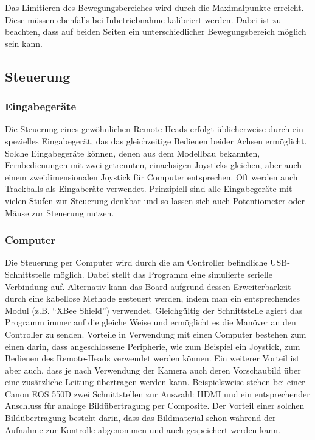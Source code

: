 \documentclass[a4paper, 12pt, bibtotocnumbered, liststotocnumbered]{scrartcl}
\begin{document}
	Das Limitieren des Bewegungsbereiches wird durch die Maximalpunkte erreicht. Diese müssen ebenfalls bei Inbetriebnahme kalibriert werden. Dabei ist zu beachten, dass auf beiden Seiten ein unterschiedlicher Bewegungsbereich möglich sein kann.

	\subsection{Steuerung}
	\subsubsection{Eingabegeräte}
	Die Steuerung eines gewöhnlichen Remote-Heads erfolgt üblicherweise durch ein spezielles Eingabegerät, das das gleichzeitige Bedienen beider Achsen ermöglicht. Solche Eingabegeräte können, denen aus dem Modellbau bekannten, Fernbedienungen mit zwei getrennten, einachsigen Joysticks gleichen, aber auch einem zweidimensionalen Joystick für Computer entsprechen. Oft werden auch Trackballs als Eingaberäte verwendet. Prinzipiell sind alle Eingabegeräte mit vielen Stufen zur Steuerung denkbar und so lassen sich auch Potentiometer oder Mäuse zur Steuerung nutzen.

	\subsubsection{Computer}
	Die Steuerung per Computer wird durch die am Controller befindliche USB-Schnittstelle möglich. Dabei stellt das Programm eine simulierte serielle Verbindung auf. Alternativ kann das Board aufgrund dessen Erweiterbarkeit durch eine kabellose Methode gesteuert werden, indem man ein entsprechendes Modul (z.B. “XBee Shield”) verwendet. Gleichgültig der Schnittstelle agiert das Programm immer auf die gleiche Weise und ermöglicht es die Manöver an den Controller zu senden. Vorteile in Verwendung mit einen Computer bestehen zum einen darin, dass angeschlossene Peripherie, wie zum Beispiel ein Joystick, zum Bedienen des Remote-Heads verwendet werden können. Ein weiterer Vorteil ist aber auch, dass je nach Verwendung der Kamera auch deren Vorschaubild über eine zusätzliche Leitung übertragen werden kann. Beispielsweise stehen bei einer Canon EOS 550D zwei Schnittstellen zur Auswahl: HDMI und ein entsprechender Anschluss für analoge Bildübertragung per Composite. Der Vorteil einer solchen Bildübertragung besteht darin, dass das Bildmaterial schon während der Aufnahme zur Kontrolle abgenommen und auch gespeichert werden kann.
\end{document}
